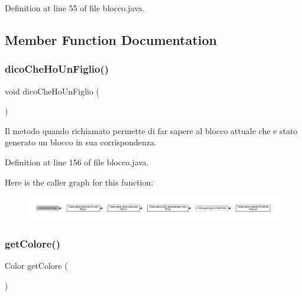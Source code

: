 Definition at line 55 of file blocco.\+java.



\subsection{Member Function Documentation}
\mbox{\label{class_snake_1_1game_1_1vipera_1_1blocco_a7380314c5c58350a175d844e7121d329}} 
\subsubsection{\texorpdfstring{dico\+Che\+Ho\+Un\+Figlio()}{dicoCheHoUnFiglio()}}
{\footnotesize\ttfamily void dico\+Che\+Ho\+Un\+Figlio (\begin{DoxyParamCaption}{ }\end{DoxyParamCaption})}



Il metodo quando richiamato permette di far sapere al blocco attuale che e\textquotesingle{} stato generato un blocco in sua corrispondenza. 



Definition at line 156 of file blocco.\+java.

Here is the caller graph for this function\+:
\nopagebreak
\begin{figure}[H]
\begin{center}
\leavevmode
\includegraphics[width=350pt]{class_snake_1_1game_1_1vipera_1_1blocco_a7380314c5c58350a175d844e7121d329_icgraph}
\end{center}
\end{figure}
\mbox{\label{class_snake_1_1game_1_1vipera_1_1blocco_ae3f520a7be49ba6d662a1504fbe4acf3}} 
\subsubsection{\texorpdfstring{get\+Colore()}{getColore()}}
{\footnotesize\ttfamily Color get\+Colore (\begin{DoxyParamCaption}{ }\end{DoxyParamCaption})}



